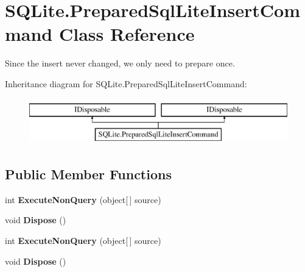 \hypertarget{classSQLite_1_1PreparedSqlLiteInsertCommand}{\section{S\-Q\-Lite.\-Prepared\-Sql\-Lite\-Insert\-Command Class Reference}
\label{classSQLite_1_1PreparedSqlLiteInsertCommand}
}


Since the insert never changed, we only need to prepare once.  


Inheritance diagram for S\-Q\-Lite.\-Prepared\-Sql\-Lite\-Insert\-Command\-:\begin{figure}[H]
\begin{center}
\leavevmode
\includegraphics[height=2.000000cm]{classSQLite_1_1PreparedSqlLiteInsertCommand}
\end{center}
\end{figure}
\subsection*{Public Member Functions}
\begin{DoxyCompactItemize}
\item 
\hypertarget{classSQLite_1_1PreparedSqlLiteInsertCommand_a9f95629a1b978710741c23129d78fccc}{int {\bfseries Execute\-Non\-Query} (object\mbox{[}$\,$\mbox{]} source)}\label{classSQLite_1_1PreparedSqlLiteInsertCommand_a9f95629a1b978710741c23129d78fccc}

\item 
\hypertarget{classSQLite_1_1PreparedSqlLiteInsertCommand_a4569b8fb13658e105658b073937efead}{void {\bfseries Dispose} ()}\label{classSQLite_1_1PreparedSqlLiteInsertCommand_a4569b8fb13658e105658b073937efead}

\item 
\hypertarget{classSQLite_1_1PreparedSqlLiteInsertCommand_a9f95629a1b978710741c23129d78fccc}{int {\bfseries Execute\-Non\-Query} (object\mbox{[}$\,$\mbox{]} source)}\label{classSQLite_1_1PreparedSqlLiteInsertCommand_a9f95629a1b978710741c23129d78fccc}

\item 
\hypertarget{classSQLite_1_1PreparedSqlLiteInsertCommand_a4569b8fb13658e105658b073937efead}{void {\bfseries Dispose} ()}\label{classSQLite_1_1PreparedSqlLiteInsertCommand_a4569b8fb13658e105658b073937efead}

\end{DoxyCompactItemize}

